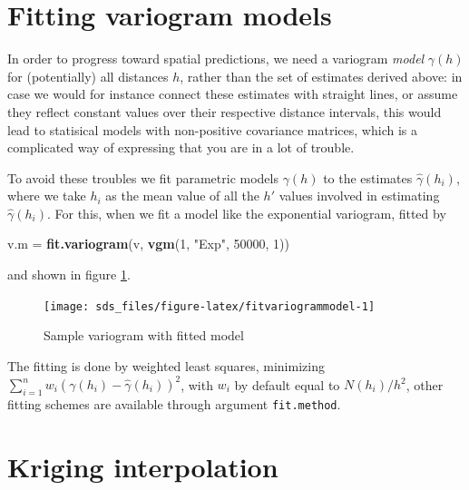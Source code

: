 \documentclass[]{book}
\newenvironment{Shaded}{\begin{snugshade}}{\end{snugshade}}
\newcommand{\DecValTok}[1]{\textcolor[rgb]{0.00,0.00,0.81}{#1}}
\newcommand{\KeywordTok}[1]{\textcolor[rgb]{0.13,0.29,0.53}{\textbf{#1}}}
\newcommand{\NormalTok}[1]{#1}
\newcommand{\StringTok}[1]{\textcolor[rgb]{0.31,0.60,0.02}{#1}}
\begin{document}
\hypertarget{fitting-variogram-models}{%
\section{Fitting variogram models}\label{fitting-variogram-models}}

In order to progress toward spatial predictions, we need a variogram \emph{model} \(\gamma(h)\) for (potentially) all distances \(h\), rather than the set of estimates derived above: in case we would for instance connect these estimates with straight lines, or assume they reflect constant values over their respective distance intervals, this would lead to statisical models with non-positive covariance matrices, which is a complicated way of expressing that you are in a lot of trouble.

To avoid these troubles we fit parametric models \(\gamma(h)\) to the estimates \(\hat{\gamma}(h_i)\), where we take \(h_i\) as the mean value of all the \(h'\) values involved in estimating \(\hat{\gamma}(h_i)\). For this, when we fit a model like the exponential variogram, fitted by

\begin{Shaded}
\begin{Highlighting}[]
\NormalTok{v.m =}\StringTok{ }\KeywordTok{fit.variogram}\NormalTok{(v, }\KeywordTok{vgm}\NormalTok{(}\DecValTok{1}\NormalTok{, }\StringTok{"Exp"}\NormalTok{, }\DecValTok{50000}\NormalTok{, }\DecValTok{1}\NormalTok{))}
\end{Highlighting}
\end{Shaded}

and shown in figure \ref{fig:fitvariogrammodel}.

\begin{figure}

{\centering \texttt{[image: sds\_files/figure-latex/fitvariogrammodel-1]} 

}

\caption{Sample variogram with fitted model}\label{fig:fitvariogrammodel}
\end{figure}

The fitting is done by weighted least squares, minimizing
\(\sum_{i=1}^{n}w_i(\gamma(h_i)-\hat{\gamma}(h_i))^2\), with \(w_i\) by
default equal to \(N(h_i)/h^2\), other fitting schemes are available
through argument \texttt{fit.method}.

\hypertarget{kriging}{%
\section{Kriging interpolation}\label{kriging}}
\end{document}
